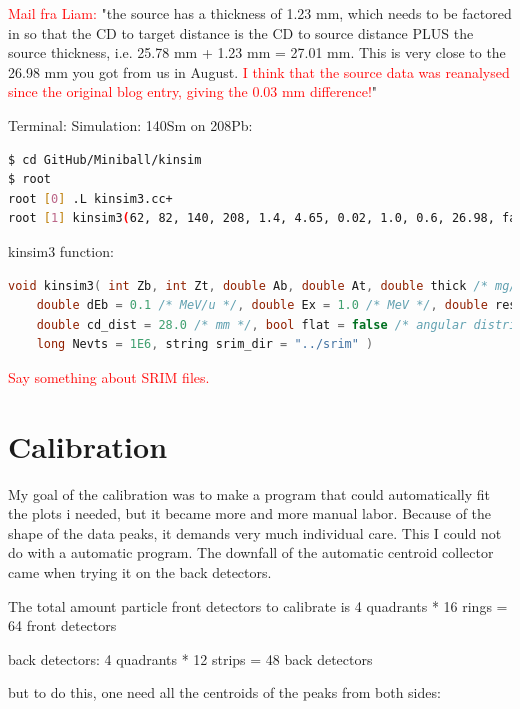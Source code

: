 \documentclass[twoside,english]{uiofysmaster/uiofysmaster}
\begin{document}
\textcolor{red}{Mail fra Liam:} \newline
"the source has a thickness of 1.23 mm, which needs to be factored in so that the CD to target distance is the CD to source distance PLUS the source thickness, i.e. 25.78 mm + 1.23 mm =  27.01 mm. 
This is very close to the 26.98 mm you got from us in August. 
\textcolor{red}{I think that the source data was reanalysed since the original blog entry, giving the 0.03 mm difference!}" \newline



Terminal: Simulation: 140Sm on 208Pb:
\begin{lstlisting}[language=sh]
$ cd GitHub/Miniball/kinsim
$ root
root [0] .L kinsim3.cc+
root [1] kinsim3(62, 82, 140, 208, 1.4, 4.65, 0.02, 1.0, 0.6, 26.98, false, 1e6, "../SRIM")
\end{lstlisting}


kinsim3 function:
\begin{lstlisting}[language=c++]
void kinsim3( int Zb, int Zt, double Ab, double At, double thick /* mg/cm^2 */, double Eb /* MeV/u */,
    double dEb = 0.1 /* MeV/u */, double Ex = 1.0 /* MeV */, double res = 0.6 /* % */,
	double cd_dist = 28.0 /* mm */, bool flat = false /* angular distribution? */,
	long Nevts = 1E6, string srim_dir = "../srim" )
\end{lstlisting}

\bigskip

\textcolor{red}{Say something about SRIM files.}

\bigskip



\section{Calibration}

My goal of the calibration was to make a program that could automatically fit the plots i needed, but it became more and more manual labor. 
Because of the shape of the data peaks, it demands very much individual care. 
This I could not do with a automatic program. 
The downfall of the automatic centroid collector came when trying it on the back detectors. 

The total amount particle front detectors to calibrate is 4 quadrants * 16 rings = 64 front detectors 

back detectors: 4 quadrants * 12 strips = 48 back detectors


but to do this, one need all the centroids of the peaks from both sides:
\end{document}
